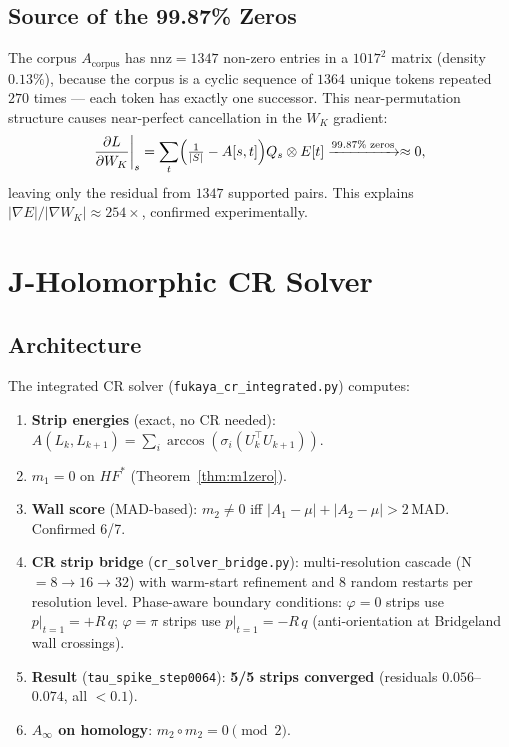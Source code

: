 \documentclass[11pt]{amsart}
\begin{document}
\subsection{Source of the 99.87\% Zeros}

The corpus $A_\mathrm{corpus}$ has $\mathrm{nnz}=1347$ non-zero entries
in a $1017^2$ matrix (density $0.13\%$), because the corpus is a
cyclic sequence of $1364$ unique tokens repeated $270$ times
--- each token has exactly one successor.
This near-permutation structure causes near-perfect cancellation in
the $W_K$ gradient:
\[
  \frac{\partial L}{\partial W_K}\bigg|_s
  = \sum_t \Bigl(\tfrac{1}{|S|} - A[s,t]\Bigr) Q_s \otimes E[t]
  \xrightarrow{99.87\%\text{ zeros}} \approx 0,
\]
leaving only the residual from $1347$ supported pairs.
This explains $|\nabla E|/|\nabla W_K| \approx 254\times$,
confirmed experimentally.

\section{J-Holomorphic CR Solver}
\label{sec:cr}

\subsection{Architecture}

The integrated CR solver (\texttt{fukaya\_cr\_integrated.py}) computes:
\begin{enumerate}
\item \textbf{Strip energies} (exact, no CR needed):
  $A(L_k,L_{k+1}) = \sum_i \arccos(\sigma_i(U_k^\top U_{k+1}))$.
\item \textbf{$m_1 = 0$} on $HF^{*}$ (Theorem~\ref{thm:m1zero}).
\item \textbf{Wall score} (MAD-based): $m_2\neq 0$ iff
  $|A_1-\mu|+|A_2-\mu|>2\,\mathrm{MAD}$. Confirmed 6/7.
\item \textbf{CR strip bridge} (\texttt{cr\_solver\_bridge.py}):
  multi-resolution cascade (N$=8\to 16\to 32$) with warm-start
  refinement and 8 random restarts per resolution level.
  Phase-aware boundary conditions:
  $\varphi=0$ strips use $p|_{t=1} = +R\,q$;
  $\varphi=\pi$ strips use $p|_{t=1} = -R\,q$
  (anti-orientation at Bridgeland wall crossings).
\item \textbf{Result} (\texttt{tau\_spike\_step0064}):
  \textbf{5/5 strips converged} (residuals $0.056$--$0.074$, all $<0.1$).
\item \textbf{$A_\infty$ on homology}: $m_2\circ m_2=0\pmod{2}$.
\end{enumerate}
\end{document}
